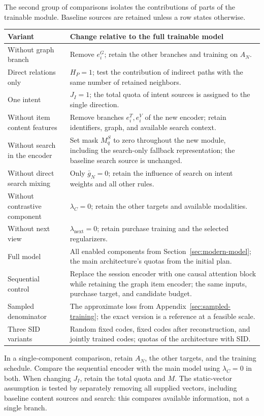 \documentclass[12pt,a4paper]{article}
\theoremstyle{plainru}
\begin{document}
The second group of comparisons isolates the contributions of parts of the trainable module.
Baseline sources are retained unless a row states otherwise.
\begin{longtable}{L{0.25\textwidth}L{0.65\textwidth}}
\toprule Variant & Change relative to the full trainable model \\\midrule\endhead
Without graph branch & Remove $e_i^G$; retain the other branches and training
on $A_N$. \\
Direct relations only & $H_P=1$; test the contribution of indirect paths
with the same number of retained neighbors. \\
One intent & $J_I=1$; the total quota of intent sources
is assigned to the single direction. \\
Without item content features & Remove branches $e_i^T,e_i^V$ of the new
encoder; retain identifiers, graph, and available search context. \\
Without search in the encoder & Set mask $M_q^S$ to zero throughout the new
module, including the search-only fallback representation;
the baseline search source is unchanged. \\
Without direct search mixing & Only $\bar g_N=0$; retain the influence of search
on intent weights and all other rules. \\
Without contrastive component & $\lambda_C=0$; retain the other targets and available
modalities. \\
Without next view & $\lambda_{\mathrm{next}}=0$; retain
purchase training and the selected regularizers. \\
Full model & All enabled components from Section~\ref{sec:modern-model};
the main architecture's quotas from the initial plan. \\
Sequential control & Replace the session encoder with one
causal attention block while retaining the graph item
encoder; the same inputs, purchase target, and candidate budget. \\
Sampled denominator & The approximate loss from
Appendix~\ref{sec:sampled-training}; the exact version is a reference
at a feasible scale. \\
Three SID variants & Random fixed codes, fixed codes
after reconstruction, and jointly trained codes; quotas of the architecture with SID. \\
\bottomrule
\end{longtable}

In a single-component comparison, retain $A_N$, the other targets,
and the training schedule. Compare the sequential encoder
with the main model using $\lambda_C=0$ in both. When changing $J_I$,
retain the total quota and $M$. The static-vector assumption
is tested by separately removing all supplied vectors,
including baseline content sources and search: this compares
available information, not a single branch.
\end{document}

